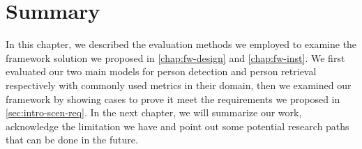 \section{Summary}

In this chapter, we described the evaluation methods we employed to examine the
framework solution we proposed in \autoref{chap:fw-design} and
\autoref{chap:fw-inst}. We first evaluated our two main models for person
detection and person retrieval respectively with commonly used metrics in their
domain, then we examined our framework by showing cases to prove it meet the
requirements we proposed in \autoref{sec:intro-scen-req}.
In the next chapter, we will summarize our work, acknowledge the limitation we
have and point out some potential research paths that can be done in the future.

